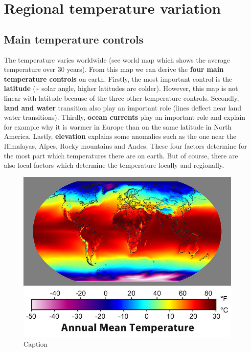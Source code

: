 \documentclass[12pt,oneside]{book}
\begin{document}
\section{Regional temperature
variation}\label{regional-temperature-variation}

\subsection{Main temperature controls}\label{main-temperature-controls}

The temperature varies worldwide (see world map which shows the average
temperature over 30 years). From this map we can derive the \textbf{four
main temperature controls} on earth. Firstly, the most important control
is the \textbf{latitude} (\textasciitilde{} solar angle, higher
latitudes are colder). However, this map is not linear with latitude
because of the three other temperature controls. Secondly, \textbf{land
and water} transition also play an important role (lines deflect near
land water transitions). Thirdly, \textbf{ocean currents} play an
important role and explain for example why it is warmer in Europe than
on the same latitude in North America. Lastly, \textbf{elevation}
explains some anomalies such as the one near the Himalayas, Alpes, Rocky
mountains and Andes. These four factors determine for the most part
which temperatures there are on earth. But of course, there are also
local factors which determine the temperature locally and regionally.

\begin{figure}

{\centering \includegraphics[width=1\linewidth]{figures/Figure217} 

}

\caption{Caption}\label{fig:MAT}
\end{figure}
\end{document}
